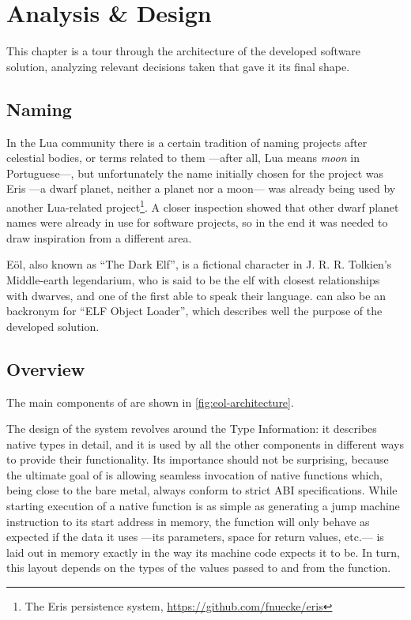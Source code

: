 
\cleardoublepage
\setchaptertoc
\chapter{Analysis \& Design}

This chapter is a tour through the architecture of the developed software
solution, analyzing relevant decisions taken that gave it its final shape.
\afterintro

\section{Naming}

In the Lua community there is a certain tradition of naming projects after
celestial bodies, or terms related to them —after all, Lua means \emph{moon}
in Portuguese—, but unfortunately the name initially chosen for the project
was Eris —a dwarf planet, neither a planet nor a moon— was already being used
by another Lua-related project\footnote{The Eris persistence system,
\url{https://github.com/fnuecke/eris}}. A closer inspection showed that other
dwarf planet names were already in use for software projects, so in the end
it was needed to draw inspiration from a different area.

Eöl, also known as “The Dark Elf”, is a fictional character in
J. R. R. Tolkien's Middle-earth legendarium, who is said to be the elf with
closest relationships with dwarves, and one of the first able to speak their
language.  \Eol* can also be an \gls{backronym} for “ELF Object Loader”,
which describes well the purpose of the developed solution.


\section{Overview}
	\label{sec:design-overview}

The main components of \Eol* are shown in \autoref{fig:eol-architecture}.

The design of the system revolves around the \textsf{Type Information}: it
describes native types in detail, and it is used by all the other components
in different ways to provide their functionality. Its importance should not be
surprising, because the ultimate goal of \Eol* is allowing seamless invocation
of native functions which, being close to the bare metal, always conform to
strict \gls{ABI} specifications. While starting execution of a native function
is as simple as generating a jump machine instruction to its start address in
memory, the function will only behave as expected if the data it uses —its
parameters, space for return values, etc.— is laid out in memory exactly in
the way its machine code expects it to be. In turn, this layout depends on the
types of the values passed to and from the function.

